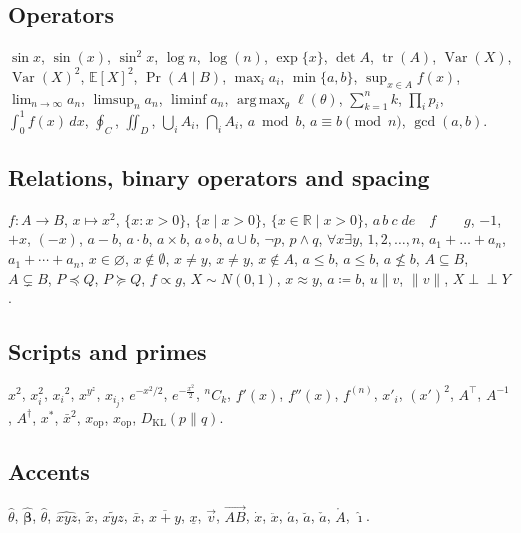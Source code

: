 \documentclass[11pt,letterpaper]{article}
\theoremstyle{definition}
\theoremstyle{remark}
\DeclareMathOperator{\Var}{Var}
\DeclareMathOperator{\tr}{tr}
\DeclareMathOperator*{\argmax}{arg\,max}
\newcommand{\E}{\mathbb{E}}
\newcommand{\R}{\mathbb{R}}
\newcommand{\mr}{\mathrm}
\newcommand{\KL}{D_\mathrm{KL}}
\begin{document}
\subsection{Operators}

$\sin x$, $\sin(x)$, $\sin^2 x$, $\log n$, $\log(n)$, $\exp\{x\}$, $\det A$, $\tr(A)$, $\Var(X)$, $\Var(X)^2$, $\E[X]^2$, $\Pr(A \mid B)$,
$\max_{i} a_i$, $\min\{a, b\}$, $\sup_{x \in A} f(x)$, $\lim_{n\to\infty} a_n$, $\limsup_{n} a_n$, $\liminf a_n$, $\argmax_\theta \ell(\theta)$,
$\sum_{k=1}^n k$, $\prod_i p_i$, $\int_0^1 f(x)\,dx$, $\oint_C$, $\iint_D$, $\bigcup_i A_i$, $\bigcap_{i} A_i$,
$a \bmod b$, $a \equiv b \pmod{n}$, $\gcd(a, b)$.

\subsection{Relations, binary operators and spacing}

$f\colon A \to B$, $x \mapsto x^2$, $\{x : x > 0\}$, $\{x \mid x > 0\}$, $\{x \in \R \;\big|\; x > 0\}$,
$a\,b\:c\;d\!e\quad f\qquad g$,
$-1$, $+x$, $(-x)$, $a - b$, $a \cdot b$, $a \times b$, $a \circ b$, $a \cup b$, $\neg p$, $p \wedge q$, $\forall x \exists y$,
$1, 2, \dots, n$, $a_1 + \dots + a_n$, $a_1 + \cdots + a_n$, $x \in \varnothing$, $x \notin \emptyset$,
$x \neq y$, $x \not= y$, $x \not\in A$, $a \leq b$, $a \leqslant b$, $a \nleq b$, $A \subseteq B$, $A \subsetneq B$, $P \preceq Q$, $P \succcurlyeq Q$, $f \propto g$, $X \sim N(0, 1)$, $x \approx y$, $a \coloneqq b$, $u \parallel v$, $\|v\|$, $X \perp\!\!\!\perp Y$.

\subsection{Scripts and primes}

$x^2$, $x_i^2$, ${x_i}^2$, $x^{y^z}$, $x_{i_j}$, $e^{-x^2/2}$, $e^{-\frac{x^2}{2}}$, ${}^n C_k$, $f'(x)$, $f''(x)$, $f^{(n)}$, $x'_i$, $(x')^2$, $A^\top$, $A^{-1}$, $A^\dagger$, $x^*$, $\bar{x}^2$,
$x_\mathrm{op}$, $x_\mr{op}$, $\KL(p \parallel q)$.

\subsection{Accents}

$\hat{\theta}$, $\hat{\bm\beta}$, $\widehat{\theta}$, $\widehat{xyz}$, $\tilde{x}$, $\widetilde{xyz}$, $\bar{x}$, $\overline{x + y}$, $\underline{x}$, $\vec{v}$, $\overrightarrow{AB}$, $\dot{x}$, $\ddot{x}$, $\acute{a}$, $\breve{a}$, $\check{a}$, $\mathring{A}$, $\hat{\imath}$.
\end{document}
